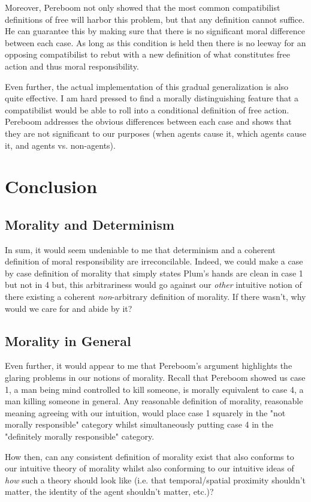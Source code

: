 \documentclass{article}
\begin{document}
Moreover, Pereboom not only showed that the most common compatibilist definitions of free will harbor this problem, but that any definition cannot suffice. He can guarantee this by making sure that there is no significant moral difference between each case. As long as this condition is held then there is no leeway for an opposing compatibilist to rebut with a new definition of what constitutes free action and thus moral responsibility.

Even further, the actual implementation of this gradual generalization is also quite effective. I am hard pressed to find a morally distinguishing feature that a compatibilist would be able to roll into a conditional definition of free action. Pereboom addresses the obvious differences between each case and shows that they are not significant to our purposes (when agents cause it, which agents cause it, and agents vs. non-agents).

\section{Conclusion}
\subsection{Morality and Determinism}
In sum, it would seem undeniable to me that determinism and a coherent definition of moral responsibility are irreconcilable. Indeed, we could make a case by case definition of morality that simply states Plum's hands are clean in case 1 but not in 4 but, this arbitrariness would go against our \textit{other} intuitive notion of there existing a coherent \textit{non}-arbitrary definition of morality. If there wasn't, why would we care for and abide by it?

\subsection{Morality in General}
Even further, it would appear to me that Pereboom's argument highlights the glaring problems in our notions of morality. Recall that Pereboom showed us case 1, a man being mind controlled to kill someone, is morally equivalent to case 4, a man killing someone in general. Any reasonable definition of morality, reasonable meaning agreeing with our intuition, would place case 1 squarely in the "not morally responsible" category whilst simultaneously putting case 4 in the "definitely morally responsible" category.

How then, can any consistent definition of morality exist that also conforms to our intuitive theory of morality whilst also conforming to our intuitive ideas of \textit{how} such a theory should look like (i.e. that temporal/spatial proximity shouldn't matter, the identity of the agent shouldn't matter, etc.)?
\end{document}
